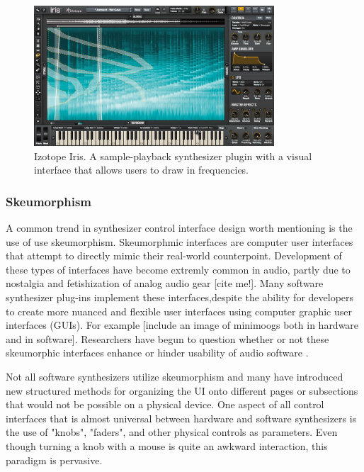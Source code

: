 \begin{figure}[ht]
    \centering
    \includegraphics[width=0.80\textwidth]{figures/background/izotope_iris.jpg}
    \caption{Izotope Iris. A sample-playback synthesizer plugin with a visual interface that allows users to draw in frequencies.}
    \label{fig:izotope_iris}
\end{figure}

\subsubsection{Skeumorphism}
A common trend in synthesizer control interface design worth mentioning is the use of use skeumorphism. Skeumorphmic interfaces are computer user interfaces that attempt to directly mimic their real-world counterpoint. Development of these types of interfaces have become extremly common in audio, partly due to nostalgia and fetishization of analog audio gear [cite me!]. Many software synthesizer plug-ins implement these interfaces,despite the ability for developers to create more nuanced and flexible user interfaces using computer graphic user interfaces (GUIs). For example [include an image of minimoogs both in hardware and in software]. Researchers have begun to question whether or not these skeumorphic interfaces enhance or hinder usability of audio software \cite{lindh2018beyond}. 

Not all software synthesizers utilize skeumorphism and many have introduced new structured methods for organizing the UI onto different pages or subsections that would not be possible on a physical device. One aspect of all control interfaces that is almost universal between hardware and software synthesizers is the use of "knobs", "faders", and other physical controls as parameters. Even though turning a knob with a mouse is quite an awkward interaction, this paradigm is pervasive.


